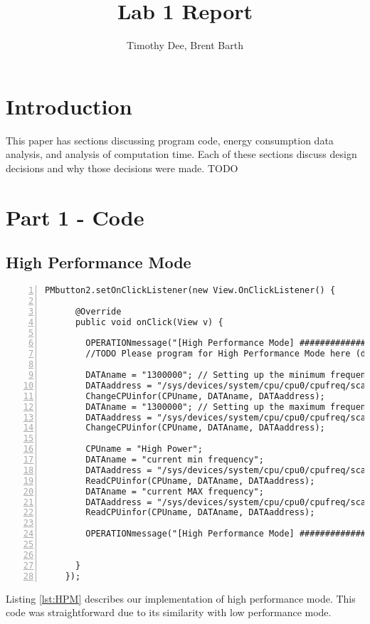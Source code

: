 \documentclass{article} %
\author{Timothy Dee, Brent Barth}
\title{Lab 1 Report}
\begin{document}
\twocolumn
\thispagestyle{empty}   %
\maketitle      %



\section{Introduction}
This paper has sections discussing program code, energy consumption data analysis, and analysis of computation time. Each of these sections discuss design decisions and why those decisions were made.
TODO

\section{Part 1 - Code}
\subsection{High Performance Mode}
\begin{lstlisting}[float=*, caption={High Performance Mode},label={lst:HPM},numbers=left]
PMbutton2.setOnClickListener(new View.OnClickListener() {

      @Override
      public void onClick(View v) {

        OPERATIONmessage("[High Performance Mode] ###########################################");
        //TODO Please program for High Performance Mode here (done)

        DATAname = "1300000"; // Setting up the minimum frequency 1300 Mhz
        DATAaddress = "/sys/devices/system/cpu/cpu0/cpufreq/scaling_min_freq";
        ChangeCPUinfor(CPUname, DATAname, DATAaddress);
        DATAname = "1300000"; // Setting up the maximum frequency at 1300 MHz
        DATAaddress = "/sys/devices/system/cpu/cpu0/cpufreq/scaling_max_freq";
        ChangeCPUinfor(CPUname, DATAname, DATAaddress);

        CPUname = "High Power";
        DATAname = "current min frequency";
        DATAaddress = "/sys/devices/system/cpu/cpu0/cpufreq/scaling_min_freq";
        ReadCPUinfor(CPUname, DATAname, DATAaddress);
        DATAname = "current MAX frequency";
        DATAaddress = "/sys/devices/system/cpu/cpu0/cpufreq/scaling_max_freq";
        ReadCPUinfor(CPUname, DATAname, DATAaddress);

        OPERATIONmessage("[High Performance Mode] ###########################################");


      }
    });
\end{lstlisting}
Listing \ref{lst:HPM} describes our implementation of high performance mode. This code was straightforward due to its similarity with low performance mode.
\end{document}
